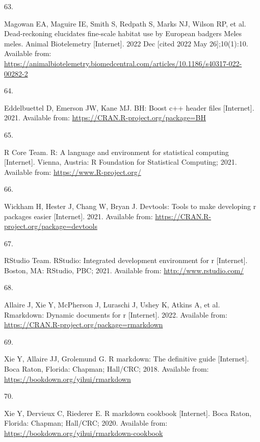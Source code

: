 \documentclass[10pt,a4paper]{article}
\newlength{\cslhangindent}
\newlength{\csllabelwidth}
\newlength{\cslentryspacingunit} %
\newenvironment{CSLReferences}[2] %
 {%
  \setlength{\parindent}{0pt}
  \ifodd #1
  \let\oldpar\par
  \def\par{\hangindent=\cslhangindent\oldpar}
  \fi
  \setlength{\parskip}{#2\cslentryspacingunit}
 }%
 {}
\newcommand{\CSLLeftMargin}[1]{\parbox[t]{\csllabelwidth}{#1}}
\newcommand{\CSLRightInline}[1]{\parbox[t]{\linewidth - \csllabelwidth}{#1}\break}
\begin{document}
\begin{CSLReferences}{0}{0}
\leavevmode{}%
\CSLLeftMargin{63. }
\CSLRightInline{Magowan EA, Maguire IE, Smith S, Redpath S, Marks NJ, Wilson RP, et al. Dead-reckoning elucidates fine-scale habitat use by {European} badgers {Meles} meles. Animal Biotelemetry {[}Internet{]}. 2022 Dec {[}cited 2022 May 26{]};10(1):10. Available from: \url{https://animalbiotelemetry.biomedcentral.com/articles/10.1186/s40317-022-00282-2}}

\leavevmode{}%
\CSLLeftMargin{64. }
\CSLRightInline{Eddelbuettel D, Emerson JW, Kane MJ. BH: Boost c++ header files {[}Internet{]}. 2021. Available from: \url{https://CRAN.R-project.org/package=BH}}

\leavevmode{}%
\CSLLeftMargin{65. }
\CSLRightInline{R Core Team. R: A language and environment for statistical computing {[}Internet{]}. Vienna, Austria: R Foundation for Statistical Computing; 2021. Available from: \url{https://www.R-project.org/}}

\leavevmode{}%
\CSLLeftMargin{66. }
\CSLRightInline{Wickham H, Hester J, Chang W, Bryan J. Devtools: Tools to make developing r packages easier {[}Internet{]}. 2021. Available from: \url{https://CRAN.R-project.org/package=devtools}}

\leavevmode{}%
\CSLLeftMargin{67. }
\CSLRightInline{RStudio Team. RStudio: Integrated development environment for r {[}Internet{]}. Boston, MA: RStudio, PBC; 2021. Available from: \url{http://www.rstudio.com/}}

\leavevmode{}%
\CSLLeftMargin{68. }
\CSLRightInline{Allaire J, Xie Y, McPherson J, Luraschi J, Ushey K, Atkins A, et al. Rmarkdown: Dynamic documents for r {[}Internet{]}. 2022. Available from: \url{https://CRAN.R-project.org/package=rmarkdown}}

\leavevmode{}%
\CSLLeftMargin{69. }
\CSLRightInline{Xie Y, Allaire JJ, Grolemund G. R markdown: The definitive guide {[}Internet{]}. Boca Raton, Florida: Chapman; Hall/CRC; 2018. Available from: \url{https://bookdown.org/yihui/rmarkdown}}

\leavevmode{}%
\CSLLeftMargin{70. }
\CSLRightInline{Xie Y, Dervieux C, Riederer E. R markdown cookbook {[}Internet{]}. Boca Raton, Florida: Chapman; Hall/CRC; 2020. Available from: \url{https://bookdown.org/yihui/rmarkdown-cookbook}}


\end{CSLReferences}
\end{document}
